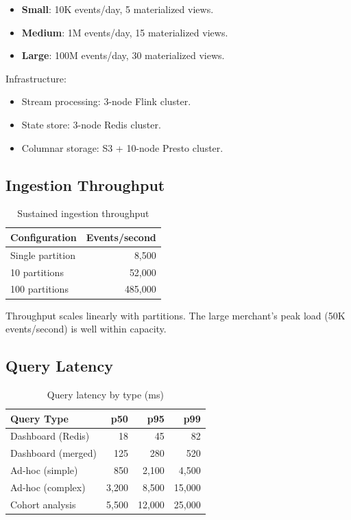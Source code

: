 \documentclass[11pt,twocolumn]{article}
\begin{document}
\begin{itemize}
\item \textbf{Small}: 10K events/day, 5 materialized views.
\item \textbf{Medium}: 1M events/day, 15 materialized views.
\item \textbf{Large}: 100M events/day, 30 materialized views.
\end{itemize}

Infrastructure:
\begin{itemize}
\item Stream processing: 3-node Flink cluster.
\item State store: 3-node Redis cluster.
\item Columnar storage: S3 + 10-node Presto cluster.
\end{itemize}

\subsection{Ingestion Throughput}

\begin{table}[h]
\centering
\caption{Sustained ingestion throughput}
\label{tab:throughput}
\begin{tabular}{lr}
\hline
Configuration & Events/second \\
\hline
Single partition & 8,500 \\
10 partitions & 52,000 \\
100 partitions & 485,000 \\
\hline
\end{tabular}
\end{table}

Throughput scales linearly with partitions. The large merchant's peak load (50K events/second) is well within capacity.

\subsection{Query Latency}

\begin{table}[h]
\centering
\caption{Query latency by type (ms)}
\label{tab:query_latency}
\begin{tabular}{lrrr}
\hline
Query Type & p50 & p95 & p99 \\
\hline
Dashboard (Redis) & 18 & 45 & 82 \\
Dashboard (merged) & 125 & 280 & 520 \\
Ad-hoc (simple) & 850 & 2,100 & 4,500 \\
Ad-hoc (complex) & 3,200 & 8,500 & 15,000 \\
Cohort analysis & 5,500 & 12,000 & 25,000 \\
\hline
\end{tabular}
\end{table}
\end{document}
